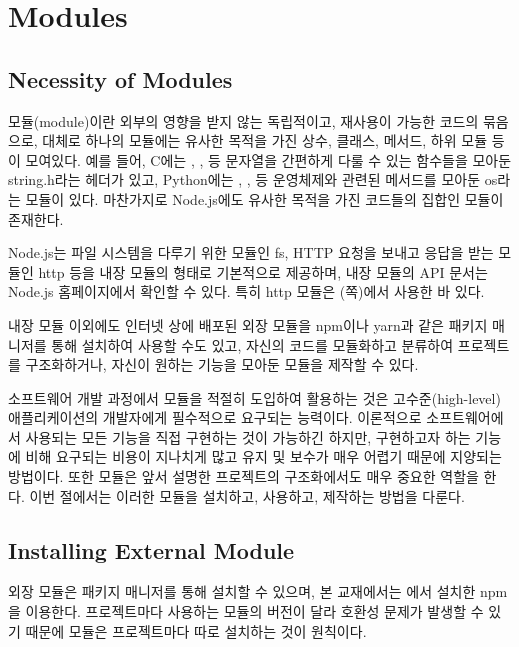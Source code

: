 \section{Modules}\label{sect:modules}

\subsection*{Necessity of Modules}

모듈(module)이란 외부의 영향을 받지 않는 독립적이고, 재사용이 가능한 코드의 묶음으로, 대체로 하나의 모듈에는 유사한 목적을 가진 상수, 클래스, 메서드, 하위 모듈 등이 모여있다. 예를 들어, C에는 , ,  등 문자열을 간편하게 다룰 수 있는 함수들을 모아둔 string.h라는 헤더가 있고, Python에는 , ,  등 운영체제와 관련된 메서드를 모아둔 os라는 모듈이 있다. 마찬가지로 Node.js에도 유사한 목적을 가진 코드들의 집합인 모듈이 존재한다.

Node.js는 파일 시스템을 다루기 위한 모듈인 fs, HTTP 요청을 보내고 응답을 받는 모듈인 http 등을 내장 모듈의 형태로 기본적으로 제공하며, 내장 모듈의 API 문서는 Node.js 홈페이지에서 확인할 수 있다. 특히 http 모듈은 (\pageref{code:nodejs-simple-web-server}쪽)에서 사용한 바 있다.

내장 모듈 이외에도 인터넷 상에 배포된 외장 모듈을 npm이나 yarn과 같은 패키지 매니저를 통해 설치하여 사용할 수도 있고, 자신의 코드를 모듈화하고 분류하여 프로젝트를 구조화하거나, 자신이 원하는 기능을 모아둔 모듈을 제작할 수 있다.

소프트웨어 개발 과정에서 모듈을 적절히 도입하여 활용하는 것은 고수준(high-level) 애플리케이션의 개발자에게 필수적으로 요구되는 능력이다. 이론적으로 소프트웨어에서 사용되는 모든 기능을 직접 구현하는 것이 가능하긴 하지만, 구현하고자 하는 기능에 비해 요구되는 비용이 지나치게 많고 유지 및 보수가 매우 어렵기 때문에 지양되는 방법이다. 또한 모듈은 앞서 설명한 프로젝트의 구조화에서도 매우 중요한 역할을 한다. 이번 절에서는 이러한 모듈을 설치하고, 사용하고, 제작하는 방법을 다룬다.

\subsection*{Installing External Module}

외장 모듈은 패키지 매니저를 통해 설치할 수 있으며, 본 교재에서는 에서 설치한 npm을 이용한다. 프로젝트마다 사용하는 모듈의 버전이 달라 호환성 문제가 발생할 수 있기 때문에 모듈은 프로젝트마다 따로 설치하는 것이 원칙이다.

